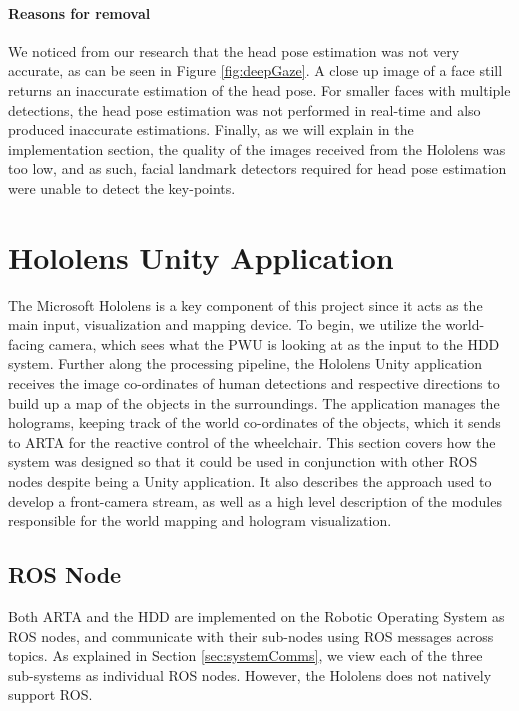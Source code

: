 \paragraph{Reasons for removal} We noticed from our research that the head pose estimation was not very accurate, as can be seen in Figure \ref{fig:deepGaze}. A close up image of a face still returns an inaccurate estimation of the head pose. For smaller faces with multiple detections, the head pose estimation was not performed in real-time and also produced inaccurate estimations. Finally, as we will explain in the implementation section, the quality of the images received from the Hololens was too low, and as such, facial landmark detectors required for head pose estimation were unable to detect the key-points.

\section{Hololens Unity Application}
The Microsoft Hololens is a key component of this project since it acts as the main input, visualization and mapping device. To begin, we utilize the world-facing camera, which sees what the PWU is looking at as the input to the HDD system. Further along the processing pipeline, the Hololens Unity application receives the image co-ordinates of human detections and respective directions to build up a map of the objects in the surroundings. The application manages the holograms, keeping track of the world co-ordinates of the objects, which it sends to ARTA for the reactive control of the wheelchair.
This section covers how the system was designed so that it could be used in conjunction with other ROS nodes despite being a Unity application. It also describes the approach used to develop a front-camera stream, as well as a high level description of the modules responsible for the world mapping and hologram visualization.

\subsection{ROS Node}
Both ARTA and the HDD are implemented on the Robotic Operating System as ROS nodes, and communicate with their sub-nodes using ROS messages across topics. As explained in Section \ref{sec:systemComms}, we view each of the three sub-systems as individual ROS nodes. However, the Hololens does not natively support ROS.

